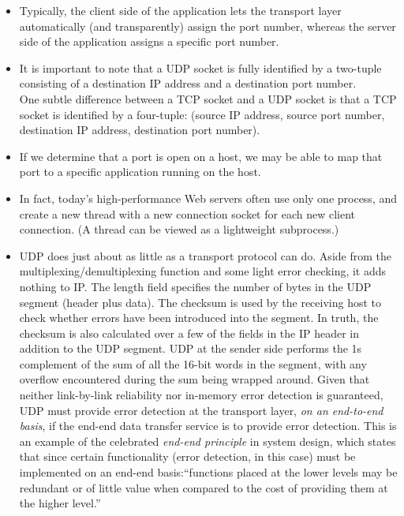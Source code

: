 \begin{itemize}
\item
Typically, the client side of the application lets the transport layer automatically (and transparently) assign the port number, whereas the server side of the application assigns a specific port number.

\item
It is important to note that a UDP socket is fully identified by a two-tuple consisting of a destination IP address and a destination port number.\\
One subtle difference between a TCP socket and a UDP socket is that a TCP socket is identified by a four-tuple: (source IP address, source port number, destination IP address, destination port number).

\item
If we determine that a port is open on a host, we may be able to map that port to a specific application running on the host.

\item
In fact, today's high-performance Web servers often use only one process, and create a new thread with a new connection socket for each new client connection. (A thread can be viewed as a lightweight subprocess.)

\item
UDP does just about as little as a transport protocol can do. Aside from the multiplexing/demultiplexing function and some light error checking, it adds nothing to IP.
The length field specifies the number of bytes in the UDP segment (header plus data).
The checksum is used by the receiving host to check whether errors have been introduced into the segment. In truth, the checksum is also calculated over a few of the fields in the IP header in addition to the UDP segment.
UDP at the sender side performs the 1s complement of the sum of all the 16-bit words in the segment, with any overflow encountered during the sum being wrapped around.
Given that neither link-by-link reliability nor in-memory error detection is guaranteed, UDP must provide error detection at the transport layer, \textit{on an end-to-end basis}, if the end-end data transfer service is to provide error detection. This is an example of the celebrated \textit{end-end principle} in system design, which states that since certain functionality (error detection, in this case) must be implemented on an end-end basis:``functions placed at the lower levels may be redundant or of little value when compared to the cost of providing them at the higher level.''


\end{itemize}
